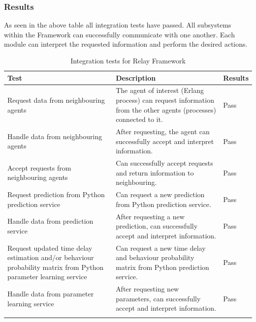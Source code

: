 \documentclass{report}
\begin{document}
\subsubsection{Results}
As seen in the above table all integration tests have passed. All subsystems within the Framework can successfully communicate with one another. Each module can interpret the requested information and perform the desired actions.

\begin{longtable}[H] {| P{3.5cm} | P{10cm} | P{1.5cm} |}
\hline
    Test & Description & Results \\ \hline
    Request data from neighbouring agents                                                                            & The agent of interest (Erlang process) can request information from the other agents (processes) connected to it. & Pass    \\ \hline
    Handle data from neighbouring agents                                                                             & After requesting, the agent can successfully accept and interpret information.                                     & Pass    \\ \hline
    Accept requests from neighbouring agents                                                                         & Can successfully accept requests and return information to neighbouring.                                          & Pass    \\ \hline
    Request prediction from Python prediction service                                                                & Can request a new prediction from Python prediction service.                                                      & Pass    \\ \hline
    Handle data from prediction service                                                                              & After requesting a new prediction, can successfully accept and interpret information.                              & Pass    \\ \hline
    Request updated time delay estimation and/or behaviour probability matrix from Python parameter learning service & Can request a new time delay and behaviour probability matrix from Python prediction service.                     & Pass    \\ \hline
    Handle data from parameter learning service                                                                      & After requesting new parameters, can successfully accept and interpret information.                              & Pass    \\ \hline
\caption{Integration tests for Relay Framework}
\end{longtable}
\end{document}
